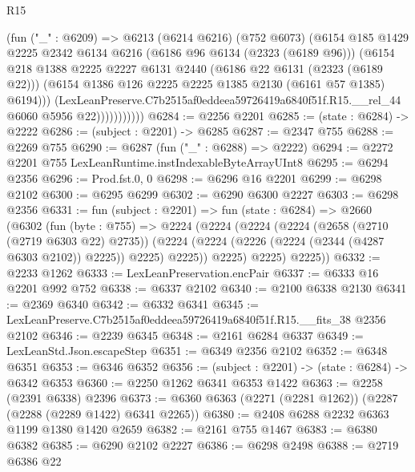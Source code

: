 \begin{lexlean}{R15}
\begin{coremodule}
                      (fun ("_" : @6209) =>
                      @6213
                        (@6214 @6216)
                        (@752 @6073)
                        (@6154
                          @185
                          @1429
                          @2225
                          @2342
                          @6134
                          @6216
                          (@6186 @96 @6134 (@2323 (@6189 @96)))
                          (@6154
                            @218
                            @1388
                            @2225
                            @2227
                            @6131
                            @2440
                            (@6186 @22 @6131 (@2323 (@6189 @22)))
                            (@6154 @1386 @126 @2225 @2225 @1385 @2130 (@6161 @57 @1385) @6194)))
                        (LexLeanPreserve.C7b2515af0eddeea59726419a6840f51f.R15.__rel_44
                          @6060
                          @5956
                          @22)))))))))))
@6284 := @2256 @2201
@6285 := (state : @6284) -> @2222
@6286 := (subject : @2201) -> @6285
@6287 := @2347 @755
@6288 := @2269 @755
@6290 := @6287 (fun ("_" : @6288) => @2222)
@6294 := @2272 @2201 @755 LexLeanRuntime.instIndexableByteArrayUInt8
@6295 := @6294 @2356
@6296 := Prod.fst.{0, 0}
@6298 := @6296 @16 @2201
@6299 := @6298 @2102
@6300 := @6295 @6299
@6302 := @6290 @6300 @2227
@6303 := @6298 @2356
@6331 := fun (subject : @2201) =>
  fun (state : @6284) =>
  @2660
    (@6302
      (fun (byte : @755) =>
      @2224
        (@2224
          (@2224
            (@2224
              (@2658 (@2710 (@2719 @6303 @22) @2735))
              (@2224 (@2224 (@2226 (@2224 (@2344 (@4287 @6303 @2102)) @2225)) @2225) @2225))
            @2225)
          @2225)
        @2225))
@6332 := @2233 @1262
@6333 := LexLeanPreservation.encPair
@6337 := @6333 @16 @2201 @992 @752
@6338 := @6337 @2102
@6340 := @2100 @6338 @2130
@6341 := @2369 @6340
@6342 := @6332 @6341
@6345 := LexLeanPreserve.C7b2515af0eddeea59726419a6840f51f.R15.__fits_38 @2356 @2102
@6346 := @2239 @6345
@6348 := @2161 @6284 @6337
@6349 := LexLeanStd.Json.escapeStep
@6351 := @6349 @2356 @2102
@6352 := @6348 @6351
@6353 := @6346 @6352
@6356 := (subject : @2201) -> (state : @6284) -> @6342 @6353
@6360 := @2250 @1262 @6341 @6353 @1422
@6363 := @2258 (@2391 @6338) @2396
@6373 := @6360 @6363 (@2271 (@2281 @1262)) (@2287 (@2288 (@2289 @1422) @6341 @2265))
@6380 := @2408 @6288 @2232 @6363 @1199 @1380 @1420 @2659
@6382 := @2161 @755 @1467
@6383 := @6380 @6382
@6385 := @6290 @2102 @2227
@6386 := @6298 @2498
@6388 := @2719 @6386 @22

\end{coremodule}
\end{lexlean}
